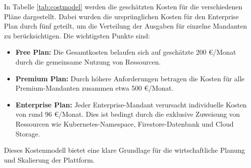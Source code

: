 In Tabelle \ref{tab:costmodel} werden die geschätzten Kosten für die verschiedenen Pläne dargestellt. Dabei wurden die ursprünglichen Kosten für den Enterprise Plan durch fünf geteilt, um die Verteilung der Ausgaben für einzelne Mandanten zu berücksichtigen. Die wichtigsten Punkte sind:

\begin{itemize}
    \item \textbf{Free Plan:} Die Gesamtkosten belaufen sich auf geschätzte 200 €/Monat durch die gemeinsame Nutzung von Ressourcen.
    \item \textbf{Premium Plan:} Durch höhere Anforderungen betragen die Kosten für alle Premium-Mandanten zusammen etwa 500 €/Monat.
    \item \textbf{Enterprise Plan:} Jeder Enterprise-Mandant verursacht individuelle Kosten von rund 96 €/Monat. Dies ist bedingt durch die exklusive Zuweisung von Ressourcen wie Kubernetes-Namespace, Firestore-Datenbank und Cloud Storage.
\end{itemize}

Dieses Kostenmodell bietet eine klare Grundlage für die wirtschaftliche Planung und Skalierung der Plattform.
